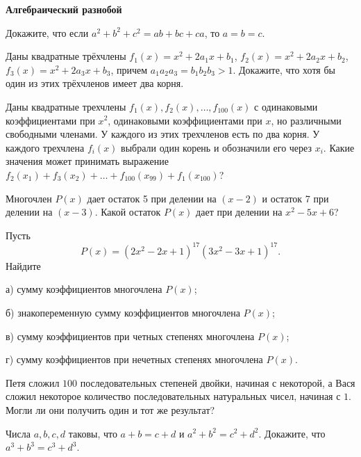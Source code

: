 \documentclass{article}
\begin{document}
    \large

    \begin{center}
        \textbf{Алгебраический разнобой}
    \end{center}

    \begin{enumerate_boxed}

        \item Докажите, что если $a^2 + b^2 + c^2 = ab + bc + ca$, то $a = b = c$.

        \item  Даны квадратные трёхчлены $f_1(x) = x^2 + 2a_{1}x + b_1$, $f_2(x) = x^2 + 2a_{2}x + b_2$, $f_3(x) = x^2 + 2a_{3}x + b_3$, причем $a_{1}a_{2}a_3 = b_{1}b_{2}b_3 > 1$.
        Докажите, что хотя бы один из этих трёхчленов имеет два корня.

        \item Даны квадратные трехчлены $f_1(x), f_2(x), \ldots, f_{100}(x)$ с одинаковыми коэффициентами при $x^2$, одинаковыми коэффициентами при $x$, но различными свободными членами.
        У каждого из этих трехчленов есть по два корня.
        У каждого трехчлена $f_i(x)$ выбрали один корень и обозначили его через $x_i$.
        Какие значения может принимать выражение $f_2(x_1) + f_3(x_2) + \ldots + f_{100}(x_{99}) + f_1(x_{100})$?

        \item Многочлен $P(x)$ дает остаток 5 при делении на $(x-2)$ и остаток 7 при делении на $(x-3)$.
        Какой остаток $P(x)$ дает при делении на $x^2 - 5x + 6$?

        \item Пусть \[P(x) = (2x^2 - 2x + 1)^{17} (3x^2 - 3x + 1)^{17}.\] Найдите

        а) сумму коэффициентов многочлена $P(x)$;

        б) знакопеременную сумму коэффициентов многочлена $P(x)$;

        в) сумму коэффициентов при четных степенях многочлена $P(x)$;

        г) сумму коэффициентов при нечетных степенях многочлена $P(x)$.

        \item Петя сложил $100$ последовательных степеней двойки, начиная с некоторой, а Вася сложил некоторое количество последовательных натуральных чисел, начиная с $1$.
        Могли ли они получить один и тот же результат?

        \item Числа $a, b, c, d$ таковы, что $a + b = c + d$ и $a^2 + b^2 = c^2 + d^2$.
        Докажите, что $a^3 + b^3 = c^3 + d^3$.


\end{enumerate_boxed}
\end{document}
